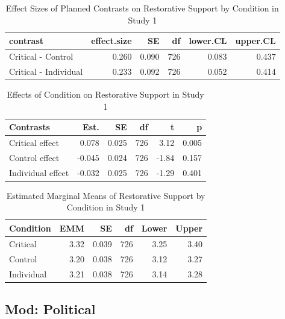 \documentclass[
]{book}
\begin{document}
\begin{table}

\caption{\label{tab:rest-contrast-s1}Effect Sizes of Planned Contrasts on Restorative Support by Condition in Study 1}
\centering
\fontsize{13}{15}\selectfont
\begin{tabular}[t]{lrrrrr}
\toprule
contrast & effect.size & SE & df & lower.CL & upper.CL\\
\midrule
Critical - Control & 0.260 & 0.090 & 726 & 0.083 & 0.437\\
Critical - Individual & 0.233 & 0.092 & 726 & 0.052 & 0.414\\
\bottomrule
\end{tabular}
\end{table}

\begin{table}

\caption{\label{tab:rest-contrast-s1}Effects of Condition on Restorative Support in Study 1}
\centering
\begin{tabular}[t]{lrrrrr}
\toprule
Contrasts & Est. & SE & df & t & p\\
\midrule
Critical effect & 0.078 & 0.025 & 726 & 3.12 & 0.005\\
Control effect & -0.045 & 0.024 & 726 & -1.84 & 0.157\\
Individual effect & -0.032 & 0.025 & 726 & -1.29 & 0.401\\
\bottomrule
\end{tabular}
\end{table}

\begin{table}

\caption{\label{tab:rest-contrast-s1}Estimated Marginal Means of Restorative Support by Condition in Study 1}
\centering
\begin{tabular}[t]{lrrrrr}
\toprule
Condition & EMM & SE & df & Lower & Upper\\
\midrule
Critical & 3.32 & 0.039 & 726 & 3.25 & 3.40\\
Control & 3.20 & 0.038 & 726 & 3.12 & 3.27\\
Individual & 3.21 & 0.038 & 726 & 3.14 & 3.28\\
\bottomrule
\end{tabular}
\end{table}

\hypertarget{mod-political-1}{%
\subsection{Mod: Political}\label{mod-political-1}}
\end{document}
